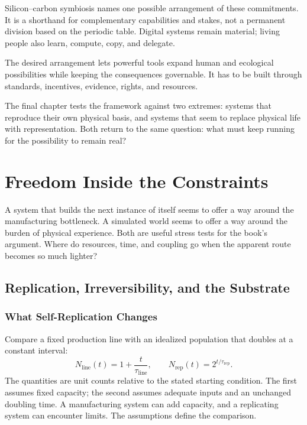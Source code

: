 \documentclass[11pt,openany]{book}
\begin{document}
Silicon--carbon symbiosis names one possible arrangement of these commitments. It is a shorthand for complementary capabilities and stakes, not a permanent division based on the periodic table. Digital systems remain material; living people also learn, compute, copy, and delegate.

The desired arrangement lets powerful tools expand human and ecological possibilities while keeping the consequences governable. It has to be built through standards, incentives, evidence, rights, and resources.

The final chapter tests the framework against two extremes: systems that reproduce their own physical basis, and systems that seem to replace physical life with representation. Both return to the same question: what must keep running for the possibility to remain real?

\chapter{Freedom Inside the Constraints}

A system that builds the next instance of itself seems to offer a way around the manufacturing bottleneck. A simulated world seems to offer a way around the burden of physical experience. Both are useful stress tests for the book's argument. Where do resources, time, and coupling go when the apparent route becomes so much lighter?

\section{Replication, Irreversibility, and the Substrate}

\subsection{What Self-Replication Changes}

Compare a fixed production line with an idealized population that doubles at a constant interval:
\begin{equation}
 N_{\mathrm{line}}(t)=1+\frac{t}{\tau_{\mathrm{line}}},
 \qquad
 N_{\mathrm{rep}}(t)=2^{t/\tau_{\mathrm{rep}}}.
\end{equation}
The quantities are unit counts relative to the stated starting condition. The first assumes fixed capacity; the second assumes adequate inputs and an unchanged doubling time. A manufacturing system can add capacity, and a replicating system can encounter limits. The assumptions define the comparison.
\end{document}
